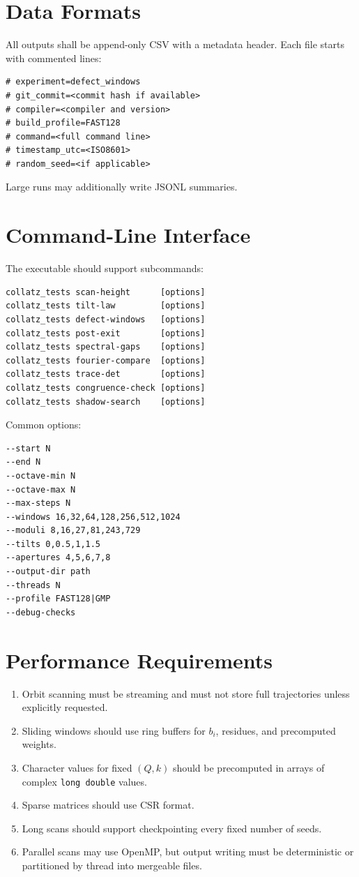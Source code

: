 \documentclass[11pt]{article}
\begin{document}
\section{Data Formats}

All outputs shall be append-only CSV with a metadata header.  Each file starts with commented lines:
\begin{lstlisting}
# experiment=defect_windows
# git_commit=<commit hash if available>
# compiler=<compiler and version>
# build_profile=FAST128
# command=<full command line>
# timestamp_utc=<ISO8601>
# random_seed=<if applicable>
\end{lstlisting}

Large runs may additionally write JSONL summaries.

\section{Command-Line Interface}

The executable should support subcommands:

\begin{lstlisting}
collatz_tests scan-height      [options]
collatz_tests tilt-law         [options]
collatz_tests defect-windows   [options]
collatz_tests post-exit        [options]
collatz_tests spectral-gaps    [options]
collatz_tests fourier-compare  [options]
collatz_tests trace-det        [options]
collatz_tests congruence-check [options]
collatz_tests shadow-search    [options]
\end{lstlisting}

Common options:
\begin{lstlisting}
--start N
--end N
--octave-min N
--octave-max N
--max-steps N
--windows 16,32,64,128,256,512,1024
--moduli 8,16,27,81,243,729
--tilts 0,0.5,1,1.5
--apertures 4,5,6,7,8
--output-dir path
--threads N
--profile FAST128|GMP
--debug-checks
\end{lstlisting}

\section{Performance Requirements}

\begin{enumerate}
\item Orbit scanning must be streaming and must not store full trajectories unless explicitly requested.
\item Sliding windows should use ring buffers for \(b_i\), residues, and precomputed weights.
\item Character values for fixed \((Q,k)\) should be precomputed in arrays of complex \texttt{long double} values.
\item Sparse matrices should use CSR format.
\item Long scans should support checkpointing every fixed number of seeds.
\item Parallel scans may use OpenMP, but output writing must be deterministic or partitioned by thread into mergeable files.
\end{enumerate}
\end{document}
